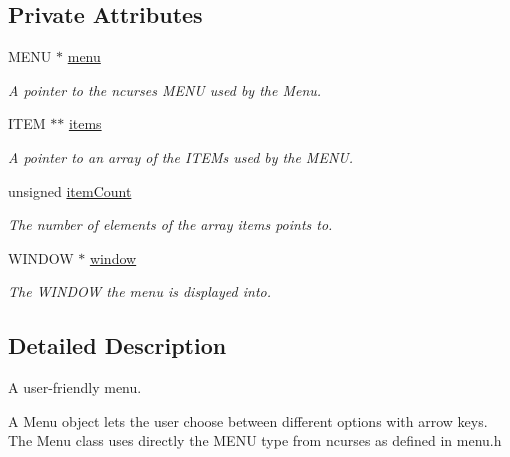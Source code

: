 \subsection*{Private Attributes}
\begin{DoxyCompactItemize}
\item 
\hypertarget{class_c_menu_a33e0e8d76b9a003fa92bd542f5111c3c}{M\-E\-N\-U $\ast$ \hyperlink{class_c_menu_a33e0e8d76b9a003fa92bd542f5111c3c}{menu}}\label{class_c_menu_a33e0e8d76b9a003fa92bd542f5111c3c}

\begin{DoxyCompactList}\small\item\em A pointer to the ncurses M\-E\-N\-U used by the Menu. \end{DoxyCompactList}\item 
\hypertarget{class_c_menu_ab5471bd4a9ade3600f6cf58f1220011a}{I\-T\-E\-M $\ast$$\ast$ \hyperlink{class_c_menu_ab5471bd4a9ade3600f6cf58f1220011a}{items}}\label{class_c_menu_ab5471bd4a9ade3600f6cf58f1220011a}

\begin{DoxyCompactList}\small\item\em A pointer to an array of the I\-T\-E\-Ms used by the M\-E\-N\-U. \end{DoxyCompactList}\item 
unsigned \hyperlink{class_c_menu_a4903eda2d318231beca52dac4373fda6}{item\-Count}
\begin{DoxyCompactList}\small\item\em The number of elements of the array items points to. \end{DoxyCompactList}\item 
\hypertarget{class_c_menu_a0d6c0c7f61a72ec9d8dd0957c5240887}{W\-I\-N\-D\-O\-W $\ast$ \hyperlink{class_c_menu_a0d6c0c7f61a72ec9d8dd0957c5240887}{window}}\label{class_c_menu_a0d6c0c7f61a72ec9d8dd0957c5240887}

\begin{DoxyCompactList}\small\item\em The W\-I\-N\-D\-O\-W the menu is displayed into. \end{DoxyCompactList}\end{DoxyCompactItemize}


\subsection{Detailed Description}
A user-\/friendly menu. 

A Menu object lets the user choose between different options with arrow keys. The Menu class uses directly the M\-E\-N\-U type from ncurses as defined in menu.\-h 

